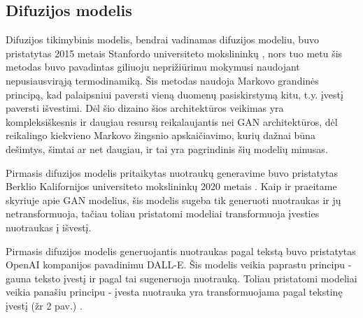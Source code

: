 \documentclass{VUMIFPSbakalaurinis}
\begin{document}
    \subsection{Difuzijos modelis}
        Difuzijos tikimybinis modelis, bendrai vadinamas difuzijos modeliu, buvo pristatytas 2015 metais Stanfordo universiteto mokslininkų \cite{DiffStart}, nors tuo metu šis metodas buvo pavadintas giliuoju neprižiūrimu mokymusi naudojant nepusiausvirąją termodinamiką. Šis metodas naudoja Markovo grandinės principą, kad palaipsniui paversti vieną duomenų pasiskirstymą kitu, t.y. įvestį paversti išvestimi. Dėl šio dizaino šios architektūros veikimas yra kompleksiškesnis ir daugiau resursų reikalaujantis nei GAN architektūros, dėl reikalingo kiekvieno Markovo žingsnio apskaičiavimo, kurių dažnai būna dešimtys, šimtai ar net daugiau, ir tai yra pagrindinis šių modelių minusas.

        Pirmasis difuzijos modelis pritaikytas nuotraukų generavime buvo pristatytas Berklio Kalifornijos universiteto mokslininkų 2020 metais \cite{DiffFirst}. Kaip ir praeitame skyriuje apie GAN modelius, šis modelis sugeba tik generuoti nuotraukas ir jų netransformuoja, tačiau toliau pristatomi modeliai transformuoja įvesties nuotraukas į išvestį. 
        
        Pirmasis difuzijos modelis generuojantis nuotraukas pagal tekstą buvo pristatytas OpenAI kompanijos pavadinimu DALL-E. Šis modelis veikia paprastu principu - gauna teksto įvestį ir pagal tai sugeneruoja nuotrauką. Toliau pristatomi modeliai veikia panašiu principu - įvesta nuotrauka yra transformuojama pagal tekstinę įvestį (žr 2 pav.) .
\end{document}
